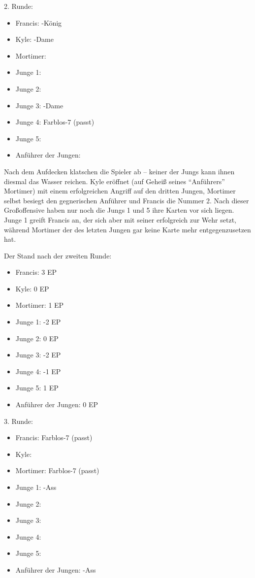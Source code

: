 2. Runde:
\begin {itemize}
\item Francis: \pik-König
\item Kyle: \kreuz-Dame
\item Mortimer: 
\item Junge 1: 
\item Junge 2: 
\item Junge 3: \herz-Dame
\item Junge 4: Farblos-7 (passt)
\item Junge 5: 
\item Anführer der Jungen: 
\end {itemize}

Nach dem Aufdecken klatschen die Spieler ab -- keiner der Jungs kann ihnen diesmal das Wasser reichen. Kyle eröffnet (auf Geheiß seines "`Anführers"' Mortimer) mit einem erfolgreichen Angriff auf den dritten Jungen, Mortimer selbst besiegt den gegnerischen Anführer und Francis die Nummer 2. Nach dieser Großoffensive haben nur noch die Jungs 1 und 5 ihre Karten vor sich liegen. Junge 1 greift Francis an, der sich aber mit seiner  erfolgreich zur Wehr setzt, während Mortimer der  des letzten Jungen gar keine Karte mehr entgegenzusetzen hat.

Der Stand nach der zweiten Runde:
\begin {itemize}
\item Francis: 3 EP
\item Kyle: 0 EP
\item Mortimer: 1 EP
\item Junge 1: -2 EP
\item Junge 2: 0 EP
\item Junge 3: -2 EP
\item Junge 4: -1 EP
\item Junge 5: 1 EP
\item Anführer der Jungen: 0 EP
\end {itemize}

3. Runde:
\begin {itemize}
\item Francis: Farblos-7 (passt)
\item Kyle: 
\item Mortimer: Farblos-7 (passt)
\item Junge 1: \herz-Ass
\item Junge 2: 
\item Junge 3: 
\item Junge 4: 
\item Junge 5: 
\item Anführer der Jungen: \herz-Ass
\end {itemize}

